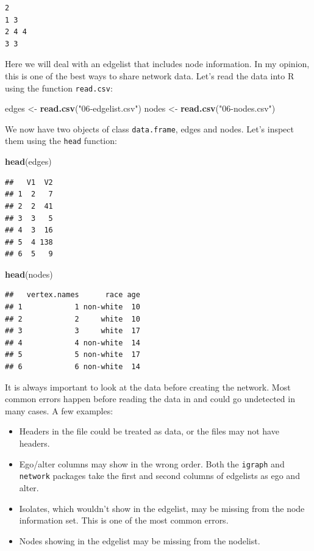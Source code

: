 \documentclass[
]{book}
\newenvironment{Shaded}{\begin{snugshade}}{\end{snugshade}}
\newcommand{\FunctionTok}[1]{\textcolor[rgb]{0.13,0.29,0.53}{\textbf{#1}}}
\newcommand{\NormalTok}[1]{#1}
\newcommand{\OtherTok}[1]{\textcolor[rgb]{0.56,0.35,0.01}{#1}}
\newcommand{\StringTok}[1]{\textcolor[rgb]{0.31,0.60,0.02}{#1}}
\begin{document}
\begin{verbatim}
2 
1 3 
2 4 4 
3 3 
\end{verbatim}

Here we will deal with an edgelist that includes node information.
In my opinion, this is one of the best ways to share network data. Let's read
the data into R using the function \texttt{read.csv}:

\begin{Shaded}
\begin{Highlighting}[]
\NormalTok{edges }\OtherTok{\textless{}{-}} \FunctionTok{read.csv}\NormalTok{(}\StringTok{"06{-}edgelist.csv"}\NormalTok{)}
\NormalTok{nodes }\OtherTok{\textless{}{-}} \FunctionTok{read.csv}\NormalTok{(}\StringTok{"06{-}nodes.csv"}\NormalTok{)}
\end{Highlighting}
\end{Shaded}

We now have two objects of class \texttt{data.frame}, edges and nodes. Let's inspect
them using the \texttt{head} function:

\begin{Shaded}
\begin{Highlighting}[]
\FunctionTok{head}\NormalTok{(edges)}
\end{Highlighting}
\end{Shaded}

\begin{verbatim}
##   V1  V2
## 1  2   7
## 2  2  41
## 3  3   5
## 4  3  16
## 5  4 138
## 6  5   9
\end{verbatim}

\begin{Shaded}
\begin{Highlighting}[]
\FunctionTok{head}\NormalTok{(nodes)}
\end{Highlighting}
\end{Shaded}

\begin{verbatim}
##   vertex.names      race age
## 1            1 non-white  10
## 2            2     white  10
## 3            3     white  17
## 4            4 non-white  14
## 5            5 non-white  17
## 6            6 non-white  14
\end{verbatim}

It is always important to look at the data before creating the network. Most common
errors happen before reading the data in and could go undetected in many cases.
A few examples:

\begin{itemize}
\item
  Headers in the file could be treated as data, or the files may not
  have headers.
\item
  Ego/alter columns may show in the wrong order. Both the \texttt{igraph} and \texttt{network}
  packages take the first and second columns of edgelists as ego and alter.
\item
  Isolates, which wouldn't show in the edgelist, may be missing from the node
  information set. This is one of the most common errors.
\item
  Nodes showing in the edgelist may be missing from the nodelist.
\end{itemize}
\end{document}
